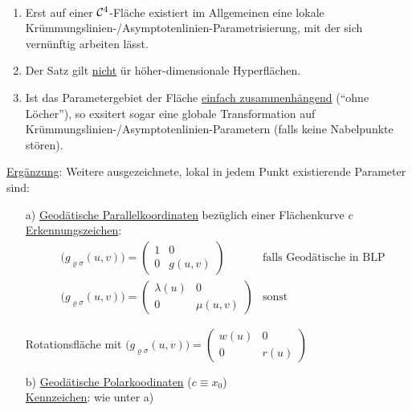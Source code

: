 \begin{bemerkung} \(\)
 \begin{enumerate}
  \item Erst auf einer \(\mathcal{C}^4\)-Fläche existiert im Allgemeinen eine lokale Krümmungslinien-/Asymptoten\-linien-Parametrisierung, mit der sich vernünftig arbeiten lässt.
  \item Der Satz gilt \uline{nicht} ür höher-dimensionale Hyperflächen.
  \item Ist das Parametergebiet der Fläche \uline{einfach zusammenhängend} (``ohne Löcher''), so exsitert sogar eine globale Transformation auf Krümmungslinien-/Asymptotenlinien-Parametern (falls keine Nabelpunkte stören).
 \end{enumerate}

\end{bemerkung}

\uline{Ergänzung}: Weitere ausgezeichnete, lokal in jedem Punkt existierende Parameter sind:
\begin{enumerate}
 \item[a)] \uline{Geodätische Parallelkoordinaten} bezüglich einer Flächenkurve \(c\) \\
 \;\uline{Erkennungszeichen}: 
 \begin{align*}
  &\big(g_{\varrho \sigma}(u,v)\big) = \begin{pmatrix}
                                      1 & 0 \\
                                      0 & g(u,v)
                                     \end{pmatrix}&\text{falls Geodätische in BLP} \\
  &\big(g_{\varrho \sigma}(u,v)\big) = \begin{pmatrix}
                                        \lambda(u) & 0 \\
                                        0 & \mu(u,v)
                                       \end{pmatrix}&\text{sonst}
 \end{align*}
 \begin{bsp}
  Rotationsfläche mit \(\big(g_{\varrho \sigma}(u,v)\big) = \begin{pmatrix}
                                                             w(u) & 0 \\
                                                             0 & r(u)
                                                            \end{pmatrix}\)
 \end{bsp}
 \item[b)] \uline{Geodätische Polarkoodinaten} (\(c \equiv x_0\)) \\
 \uline{Kennzeichen}: wie unter a)
\end{enumerate}

